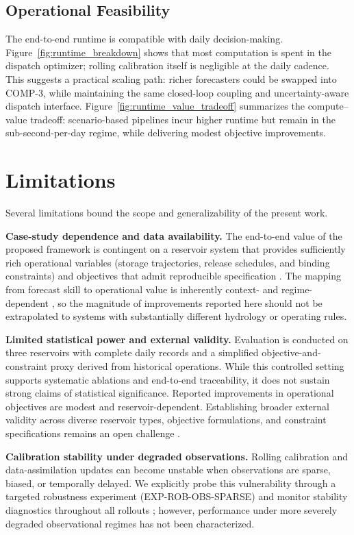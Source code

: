 \documentclass[conference]{IEEEtran}
\begin{document}
\subsection{Operational Feasibility}
The end-to-end runtime is compatible with daily decision-making. Figure~\ref{fig:runtime_breakdown}
shows that most computation is spent in the dispatch optimizer; rolling calibration itself is
negligible at the daily cadence. This suggests a practical scaling path: richer forecasters
could be swapped into COMP-3, while maintaining the same closed-loop coupling and
uncertainty-aware dispatch interface. Figure~\ref{fig:runtime_value_tradeoff} summarizes the
compute--value tradeoff: scenario-based pipelines incur higher runtime but remain in the
sub-second-per-day regime, while delivering modest objective improvements.

\section{Limitations}
Several limitations bound the scope and generalizability of the present work.

\textbf{Case-study dependence and data availability.}
The end-to-end value of the proposed framework is contingent on a reservoir system that provides sufficiently rich
operational variables (storage trajectories, release schedules, and binding constraints) and objectives that admit
reproducible specification \cite{yeh1985reservoir,labadie2004optimal}. The mapping from forecast skill to operational
value is inherently context- and regime-dependent \cite{turner2017complex}, so the magnitude of improvements reported
here should not be extrapolated to systems with substantially different hydrology or operating rules.

\textbf{Limited statistical power and external validity.}
Evaluation is conducted on three reservoirs with complete daily records and a simplified objective-and-constraint
proxy derived from historical operations. While this controlled setting supports systematic ablations and end-to-end
traceability, it does not sustain strong claims of statistical significance. Reported improvements in operational
objectives are modest and reservoir-dependent. Establishing broader external validity across diverse reservoir types,
objective formulations, and constraint specifications remains an open challenge \cite{milly2008stationarity}.

\textbf{Calibration stability under degraded observations.}
Rolling calibration and data-assimilation updates can become unstable when observations are sparse, biased, or
temporally delayed. We explicitly probe this vulnerability through a targeted robustness experiment
(EXP-ROB-OBS-SPARSE) and monitor stability diagnostics throughout all rollouts
\cite{evensen2003ensemble,moradkhani2005dual,maxwell2018constraining}; however, performance under more severely
degraded observational regimes has not been characterized.
\end{document}
